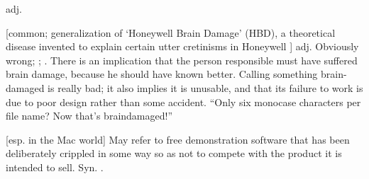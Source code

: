  adj.

\begin{inparaenum}
\item {[}common; generalization of `Honeywell Brain Damage' (HBD), a theoretical
        disease invented to explain certain utter cretinisms in Honeywell
    ] adj. Obviously wrong; ;
    . There is an implication that the person responsible
    must have suffered brain damage, because he should have known better.
    Calling something brain-damaged is really bad; it also implies it is
    unusable, and that its failure to work is due to poor design rather than
    some accident. ``Only six monocase characters per file name? Now that's
    braindamaged!''
\item {[}esp. in the Mac world] May refer to free demonstration software that
    has been deliberately crippled in some way so as not to compete with the
    product it is intended to sell. Syn. .
\end{inparaenum}

